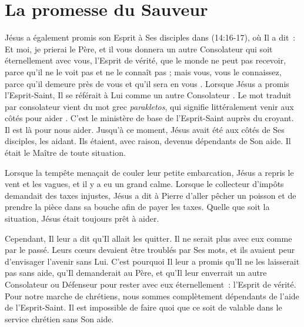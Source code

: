 \section*{La promesse du Sauveur}

Jésus a également promis son Esprit à Ses disciples dans (14:16-17), où Il a dit~: \og Et moi, je prierai le Père, et il vous donnera un autre Consolateur qui soit éternellement avec vous, l'Esprit de vérité, que le monde ne peut pas recevoir, parce qu'il ne le voit pas et ne le connaît pas ; mais vous, vous le connaissez, parce qu'il demeure près de vous et qu'il sera en vous \fg{}. Lorsque Jésus a promis l'Esprit-Saint, Il se référait à Lui comme \og un autre Consolateur \fg{}. Le mot traduit par consolateur vient du mot grec \emph{parakletos}, qui signifie littéralement \og venir aux côtés pour aider \fg{}. C'est le ministère de base de l'Esprit-Saint auprès du croyant. Il est là pour nous aider. Jusqu'à ce moment, Jésus avait été aux côtés de Ses disciples, les aidant. Ils étaient, avec raison, devenus dépendants de Son aide. Il était le Maître de toute situation.

Lorsque la tempête menaçait de couler leur petite embarcation, Jésus a repris le vent et les vagues, et il y a eu un grand calme. Lorsque le collecteur d'impôts demandait des taxes injustes, Jésus a dit à Pierre d'aller pêcher un poisson et de prendre la pièce dans sa bouche afin de payer les taxes. Quelle que soit la situation, Jésus était toujours prêt à aider.

Cependant, Il leur a dit qu'Il allait les quitter. Il ne serait plus avec eux comme par le passé. Leurs cœurs devaient être troublés par Ses mots, et ils avaient peur d'envisager l'avenir sans Lui. C'est pourquoi Il leur a promis qu'Il ne les laisserait pas sans aide, qu'Il demanderait au Père, et qu'Il leur enverrait un autre Consolateur ou Défenseur pour rester avec eux éternellement~: l'Esprit de vérité. Pour notre marche de chrétiens, nous sommes complètement dépendants de l'aide de l'Esprit-Saint. Il est impossible de faire quoi que ce soit de valable dans le service chrétien sans Son aide.


